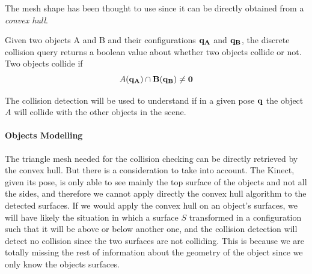 The mesh shape has been thought to use since it can be directly obtained from a \textit{convex hull}. 

Given two objects A and B and their configurations $\bf{q_A}$ and $\bf{q_B}$, the discrete collision query returns a boolean value about whether two objects collide or not. Two objects collide if
\[
A(\bf{q_A}) \cap B(\bf{q_B}) \neq 0
\]

The collision detection will be used to understand if in a given pose $\bf{q}$ the object $A$ will collide with the other objects in the scene.

\paragraph{Objects Modelling}
The triangle mesh needed for the collision checking can be directly retrieved by the convex hull. But there is a consideration to take into account. The Kinect, given its pose, is only able to see mainly the top surface of the objects and not all the sides, and therefore we cannot apply directly the convex hull algorithm to the detected surfaces. If we would apply the convex hull on an object's surfaces, we will have likely the situation in which a surface $S$ transformed in a configuration such that it will be above or below another one, and the collision detection will detect no collision since the two surfaces are not colliding. This is because we are totally missing the rest of information about the geometry of the object since we only know the objects surfaces.

